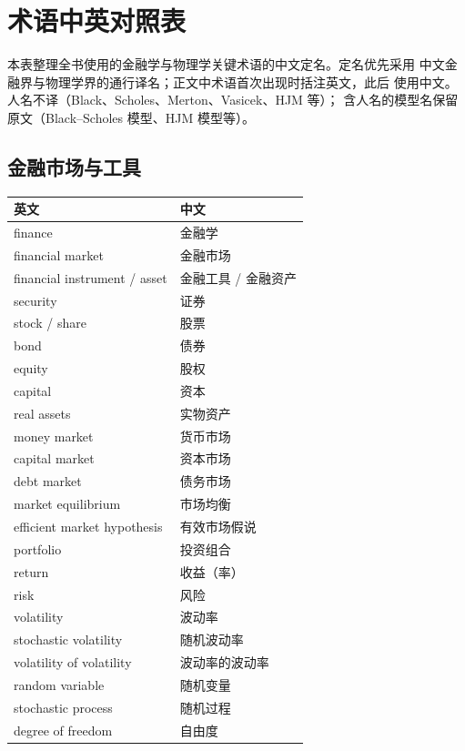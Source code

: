 \chapter{术语中英对照表}

本表整理全书使用的金融学与物理学关键术语的中文定名。定名优先采用
中文金融界与物理学界的通行译名；正文中术语首次出现时括注英文，此后
使用中文。人名不译（Black、Scholes、Merton、Vasicek、HJM 等）；
含人名的模型名保留原文（Black--Scholes 模型、HJM 模型等）。

\section{金融市场与工具}

\begin{center}
\begin{tabular}{@{}L{6.4cm}L{7.4cm}@{}}
\toprule
英文 & 中文 \\
\midrule
finance & 金融学 \\
financial market & 金融市场 \\
financial instrument / asset & 金融工具 / 金融资产 \\
security & 证券 \\
stock / share & 股票 \\
bond & 债券 \\
equity & 股权 \\
capital & 资本 \\
real assets & 实物资产 \\
money market & 货币市场 \\
capital market & 资本市场 \\
debt market & 债务市场 \\
market equilibrium & 市场均衡 \\
efficient market hypothesis & 有效市场假说 \\
portfolio & 投资组合 \\
return & 收益（率） \\
risk & 风险 \\
volatility & 波动率 \\
stochastic volatility & 随机波动率 \\
volatility of volatility & 波动率的波动率 \\
random variable & 随机变量 \\
stochastic process & 随机过程 \\
degree of freedom & 自由度 \\
\bottomrule
\end{tabular}
\end{center}

